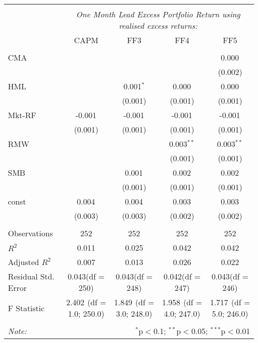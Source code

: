 \begin{table}[!htbp] \centering
\begin{tabular}{@{\extracolsep{5pt}}lcccc}
\\[-1.8ex]\hline
\hline \\[-1.8ex]
& \multicolumn{4}{c}{\textit{One Month Lead Excess Portfolio Return using realised excess returns:}} \
\cr \cline{4-5}
\\[-1.8ex] & CAPM & FF3 & FF4 & FF5 \\
\hline \\[-1.8ex]
 CMA & & & & 0.000$^{}$ \\
  & & & & (0.002) \\
 HML & & 0.001$^{*}$ & 0.000$^{}$ & 0.000$^{}$ \\
  & & (0.001) & (0.001) & (0.001) \\
 Mkt-RF & -0.001$^{}$ & -0.001$^{}$ & -0.001$^{}$ & -0.001$^{}$ \\
  & (0.001) & (0.001) & (0.001) & (0.001) \\
 RMW & & & 0.003$^{**}$ & 0.003$^{**}$ \\
  & & & (0.001) & (0.001) \\
 SMB & & 0.001$^{}$ & 0.002$^{}$ & 0.002$^{}$ \\
  & & (0.001) & (0.001) & (0.001) \\
 const & 0.004$^{}$ & 0.004$^{}$ & 0.003$^{}$ & 0.003$^{}$ \\
  & (0.003) & (0.003) & (0.002) & (0.002) \\
\hline \\[-1.8ex]
 Observations & 252 & 252 & 252 & 252 \\
 $R^2$ & 0.011 & 0.025 & 0.042 & 0.042 \\
 Adjusted $R^2$ & 0.007 & 0.013 & 0.026 & 0.022 \\
 Residual Std. Error & 0.043(df = 250) & 0.043(df = 248) & 0.042(df = 247) & 0.043(df = 246)  \\
 F Statistic & 2.402$^{}$ (df = 1.0; 250.0) & 1.849$^{}$ (df = 3.0; 248.0) & 1.958$^{}$ (df = 4.0; 247.0) & 1.717$^{}$ (df = 5.0; 246.0) \\
\hline
\hline \\[-1.8ex]
\textit{Note:} & \multicolumn{4}{r}{$^{*}$p$<$0.1; $^{**}$p$<$0.05; $^{***}$p$<$0.01} \\
\end{tabular}
\end{table}
